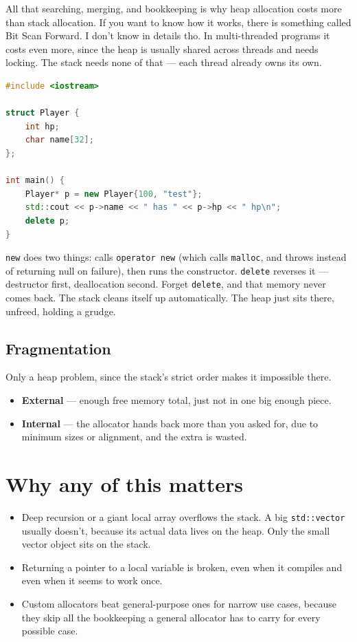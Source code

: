 \documentclass[11pt,a4paper]{article}
\begin{document}
All that searching, merging, and bookkeeping is why heap allocation costs more than stack allocation. If you want to know how it works, there is something called Bit Scan Forward. I don't know in details tho. In multi-threaded programs it costs even more, since the heap is usually shared across threads and needs locking. The stack needs none of that --- each thread already owns its own.

\begin{lstlisting}[language=C++]
#include <iostream>

struct Player {
    int hp;
    char name[32];
};

int main() {
    Player* p = new Player{100, "test"};
    std::cout << p->name << " has " << p->hp << " hp\n";
    delete p;
}
\end{lstlisting}

\texttt{new} does two things: calls \texttt{operator new} (which calls \texttt{malloc}, and throws instead of returning null on failure), then runs the constructor. \texttt{delete} reverses it --- destructor first, deallocation second. Forget \texttt{delete}, and that memory never comes back. The stack cleans itself up automatically. The heap just sits there, unfreed, holding a grudge.

\subsection{Fragmentation}

Only a heap problem, since the stack's strict order makes it impossible there.

\begin{itemize}
\item \textbf{External} --- enough free memory total, just not in one big enough piece.
\item \textbf{Internal} --- the allocator hands back more than you asked for, due to minimum sizes or alignment, and the extra is wasted.
\end{itemize}

\section{Why any of this matters}

\begin{itemize}
\item Deep recursion or a giant local array overflows the stack. A big \texttt{std::vector} usually doesn't, because its actual data lives on the heap. Only the small vector object sits on the stack.
\item Returning a pointer to a local variable is broken, even when it compiles and even when it seems to work once.
\item Custom allocators beat general-purpose ones for narrow use cases, because they skip all the bookkeeping a general allocator has to carry for every possible case.
\end{itemize}
\end{document}
